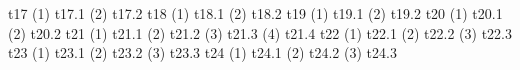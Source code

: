 \markdownRendererDocumentBegin
\markdownRendererOlBeginTight
{}t17\markdownRendererOlItemEnd 
\markdownRendererOlEndTight \markdownRendererInterblockSeparator
{}(1) t17.1\markdownRendererInterblockSeparator
{}(2) t17.2\markdownRendererInterblockSeparator
{}\markdownRendererOlBeginTight
{}t18\markdownRendererOlItemEnd 
\markdownRendererOlEndTight \markdownRendererInterblockSeparator
{}(1) t18.1\markdownRendererInterblockSeparator
{}(2) t18.2\markdownRendererInterblockSeparator
{}\markdownRendererOlBeginTight
{}t19\markdownRendererOlItemEnd 
\markdownRendererOlEndTight \markdownRendererInterblockSeparator
{}(1) t19.1\markdownRendererInterblockSeparator
{}(2) t19.2\markdownRendererInterblockSeparator
{}\markdownRendererOlBeginTight
{}t20\markdownRendererOlItemEnd 
\markdownRendererOlEndTight \markdownRendererInterblockSeparator
{}(1) t20.1\markdownRendererInterblockSeparator
{}(2) t20.2\markdownRendererInterblockSeparator
{}\markdownRendererOlBeginTight
{}t21\markdownRendererOlItemEnd 
\markdownRendererOlEndTight \markdownRendererInterblockSeparator
{}(1) t21.1\markdownRendererInterblockSeparator
{}(2) t21.2\markdownRendererInterblockSeparator
{}(3) t21.3\markdownRendererInterblockSeparator
{}(4) t21.4\markdownRendererInterblockSeparator
{}\markdownRendererOlBeginTight
{}t22\markdownRendererOlItemEnd 
\markdownRendererOlEndTight \markdownRendererInterblockSeparator
{}(1) t22.1\markdownRendererInterblockSeparator
{}(2) t22.2\markdownRendererInterblockSeparator
{}(3) t22.3\markdownRendererInterblockSeparator
{}\markdownRendererOlBeginTight
{}t23\markdownRendererOlItemEnd 
\markdownRendererOlEndTight \markdownRendererInterblockSeparator
{}(1) t23.1\markdownRendererInterblockSeparator
{}(2) t23.2\markdownRendererInterblockSeparator
{}(3) t23.3\markdownRendererInterblockSeparator
{}\markdownRendererOlBeginTight
{}t24\markdownRendererOlItemEnd 
\markdownRendererOlEndTight \markdownRendererInterblockSeparator
{}(1) t24.1\markdownRendererInterblockSeparator
{}(2) t24.2\markdownRendererInterblockSeparator
{}(3) t24.3\markdownRendererDocumentEnd